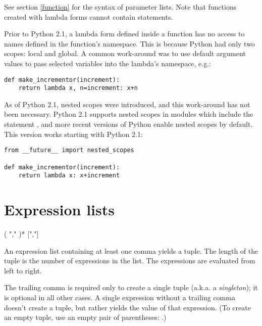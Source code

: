 See section \ref{function} for the syntax of parameter lists.  Note
that functions created with lambda forms cannot contain statements.
\label{lambda}

 Prior to Python 2.1, a lambda form defined
inside a function has no access to names defined in the function's
namespace.  This is because Python had only two scopes: local and
global.  A common work-around was to use default argument values to
pass selected variables into the lambda's namespace, e.g.:

\begin{verbatim}
def make_incrementor(increment):
    return lambda x, n=increment: x+n
\end{verbatim}

As of Python 2.1, nested scopes were introduced, and this work-around
has not been necessary.  Python 2.1 supports nested scopes in modules
which include the statement , and more recent versions of Python enable nested
scopes by default.  This version works starting with Python 2.1:

\begin{verbatim}
from __future__ import nested_scopes

def make_incrementor(increment):
    return lambda x: x+increment
\end{verbatim}


\section{Expression lists\label{exprlists}}

\begin{productionlist}
             { ( ","  )* [","]}
\end{productionlist}

An expression list containing at least one comma yields a
tuple.  The length of the tuple is the number of expressions in the
list.  The expressions are evaluated from left to right.

The trailing comma is required only to create a single tuple (a.k.a. a
\emph{singleton}); it is optional in all other cases.  A single
expression without a trailing comma doesn't create a
tuple, but rather yields the value of that expression.
(To create an empty tuple, use an empty pair of parentheses:
\code{()}.)


